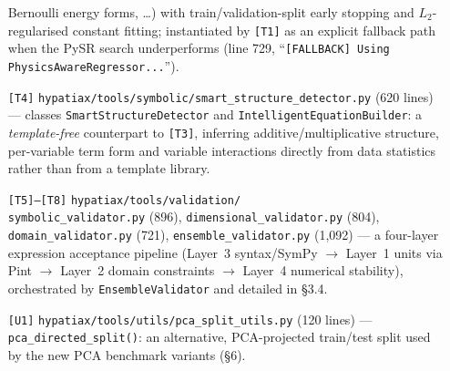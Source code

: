 \documentclass[11pt,a4paper]{article}
\newcommand{\code}[1]{\texttt{\small #1}}
\begin{document}
\begin{itemize}[leftmargin=1.4cm]
        Bernoulli energy forms, \ldots) with train/validation-split early
        stopping and $L_2$-regularised constant fitting; instantiated by
        \code{[T1]} as an explicit fallback path when the PySR search
        underperforms (line 729, ``\code{[FALLBACK] Using
        PhysicsAwareRegressor...}'').
  \item[\code{[T4]}] \code{hypatiax/tools/symbolic/smart\_structure\_detector.py}
        (620 lines) --- classes \code{SmartStructureDetector} and
        \code{IntelligentEquationBuilder}: a \emph{template-free}
        counterpart to \code{[T3]}, inferring additive/multiplicative
        structure, per-variable term form and variable interactions
        directly from data statistics rather than from a template library.
  \item[\code{[T5]--[T8]}] \code{hypatiax/tools/validation/}\\
        \code{symbolic\_validator.py} (896), \code{dimensional\_validator.py}
        (804), \code{domain\_validator.py} (721),
        \code{ensemble\_validator.py} (1{,}092) --- a four-layer expression
        acceptance pipeline (Layer~3 syntax/SymPy $\to$ Layer~1 units via
        Pint $\to$ Layer~2 domain constraints $\to$ Layer~4 numerical
        stability), orchestrated by \code{EnsembleValidator} and detailed in
        \S3.4.
  \item[\code{[U1]}] \code{hypatiax/tools/utils/pca\_split\_utils.py}
        (120 lines) --- \code{pca\_directed\_split()}: an alternative,
        PCA-projected train/test split used by the new PCA benchmark
        variants (\S6).
\end{itemize}
\end{document}
